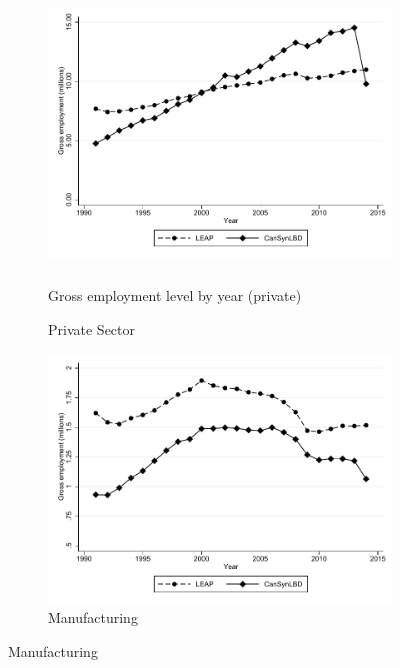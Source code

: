  
\begin{figure} [H]
\centering
\begin{subfigure}[h]{0.48\linewidth}
\label{tab:Can:GrossEmploymentPrivate}
\includegraphics[height=2.8in, width=.7\linewidth]{graphs/Gross_employment_level_by_year_private_bw.pdf} 
\caption{Gross employment level by year (private)} %
\caption{Private Sector}
\end{subfigure}
\hfill
\begin{subfigure}[h]{0.48\linewidth}
\includegraphics[width=\linewidth]{graphs/Gross_employment_level_by_year_manufacturing_bw.pdf}
\caption{Manufacturing}
\end{subfigure}%
\end{figure}


